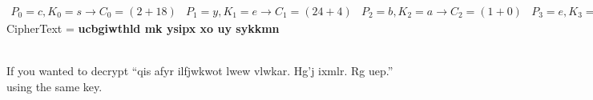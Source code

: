 \documentclass[
  letterpaper,
  DIV=11,
  numbers=noendperiod]{scrartcl}
\begin{document}
\begin{math}
    \begin{aligned}
    P_0 = c, K_0 = s → C_0 = (2+18)%
    \end{aligned}

    \begin{aligned}
    P_1 = y, K_1 = e → C_1 = (24+4)%
    \end{aligned}

    \begin{aligned}
    P_2 = b, K_2 = a → C_2 = (1+0)%
    \end{aligned}

    \begin{aligned}
    P_3 = e, K_3 = c → C_3 = (4+2)%
    \end{aligned}

    \begin{aligned}
    P_4 = r, K_4 = r → C_4 = (17+17)%
    \end{aligned}

    \begin{aligned}
    P_5 = s, K_5 = e → C_5 = (18+4)%
    \end{aligned}

    \begin{aligned}
    P_6 = t, K_6 = a → C_6 = (19+0)%
    \end{aligned}

    \begin{aligned}
    ...
    \end{aligned}
\end{math}\\
CipherText = \textbf{ucbgiwthld mk ysipx xo uy sykkmn}\\
\strut \\
If you wanted to decrypt ``qis afyr ilfjwkwot lwew vlwkar. Hg'j ixmlr.
Rg uep.'' using the same key.
\end{document}
